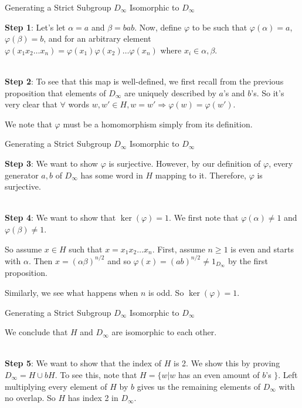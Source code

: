 \documentclass[usenames,dvipsnames]{beamer}
\begin{document}
\begin{frame}{Generating a Strict Subgroup $D_\infty$ Isomorphic to $D_\infty$}

\textbf{Step 1}: Let's let $\alpha=a$ and $\beta=bab$. Now, define $\varphi$ to be such that
$\varphi(\alpha)=a$, $\varphi(\beta)=b$, and for an arbitrary element $\varphi(x_{1}x_{2}\ldots
x_{n})=\varphi(x_{1})\varphi(x_{2})\ldots \varphi(x_{n})$ where $x_{i}\in {\alpha, \beta}$. \\~\\

\pause{}

\textbf{Step 2}: To see that this map is well-defined, we first recall from the previous proposition that
elements of $D_\infty$ are uniquely described by $a$'s and $b$'s. So it's very clear that $\forall$ words
$w,w'\in H, w=w' \Rightarrow \varphi(w)=\varphi(w')$. 

\pause{}

We note that $\varphi$ must be a homomorphism simply from its definition.

\end{frame}

\begin{frame}{Generating a Strict Subgroup $D_\infty$ Isomorphic to $D_\infty$}

\textbf{Step 3}: We want to show $\varphi$ is surjective. However, by our definition of $\varphi$, every
generator ${a,b}$ of $D_\infty$ has some word in $H$ mapping to it. Therefore, $\varphi$ is surjective.
\\~\\

\pause{}

\textbf{Step 4}: We want to show that $\ker(\varphi)={1}$. We first note that $\varphi(\alpha)\neq 1$ and
$\varphi(\beta)\neq 1$.  

\pause{}

So assume $x\in H$ such that $x=x_{1}x_{2}\ldots x_{n}$. First, assume $n\geq 1$ is even and starts with
$\alpha$. Then $x=(\alpha\beta)^{n/2}$ and so $\varphi(x)=(ab)^{n/2}\neq 1_{D_\infty}$ by the first
proposition. 

\pause{}

Similarly, we see what happens when $n$ is odd. So $\ker(\varphi)={1}$.

\end{frame}

\begin{frame}{Generating a Strict Subgroup $D_\infty$ Isomorphic to $D_\infty$}

We conclude that $H$ and $D_\infty$ are isomorphic to each other. \\~\\

\pause{}

\textbf{Step 5}: We want to show that the index of $H$ is 2. We show this by proving $D_\infty=H\cup bH$.
\pause{} To see this, note that $H=\{ w | w $ has an even amount of $b$'s $\}$. Left multiplying every
element of $H$ by $b$ gives us the remaining elements of $D_\infty$ with no overlap. So $H$ has index 2 in
$D_\infty$.

\end{frame}
\end{document}
